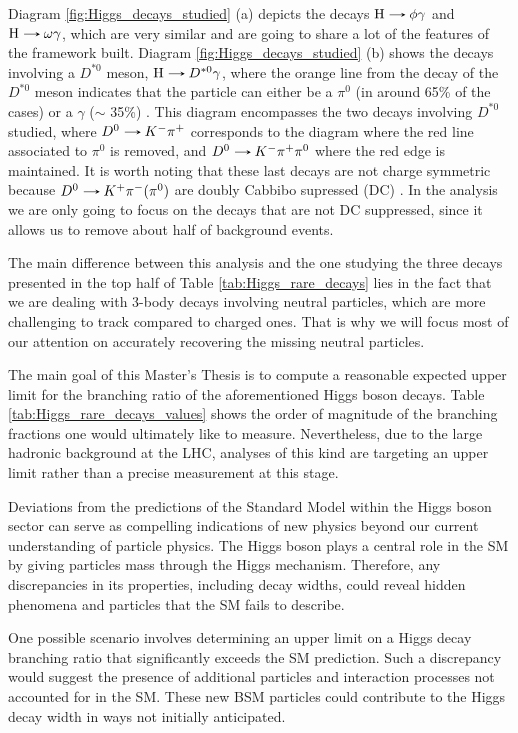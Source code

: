 Diagram \ref{fig:Higgs_decays_studied} (a) depicts the decays $\text{H}\decaysto \phi\gamma$ and $\text{H}\decaysto \omega\gamma$, which are very similar and are going to share a lot of the features of the framework built. Diagram \ref{fig:Higgs_decays_studied} (b) shows the decays involving a $D^{*0}$ meson, $\text{H}\decaysto D^{*0}\gamma$, where the orange line from the decay of the $D^{*0}$ meson indicates that the particle can either be a $\pi^{0}$ (in around 65\% of the cases) or a $\gamma$ ($\sim$ 35\%) \cite{PDG}. This diagram encompasses the two decays involving $D^{*0}$ studied, where $D^{0}\decaysto K^{-}\pi^{+}$ corresponds to the diagram where the red line associated to $\pi^{0}$ is removed, and $D^{0}\decaysto K^{-}\pi^{+}\pi^{0}$ where the red edge is maintained. It is worth noting that these last decays are not charge symmetric because $D^{0}\decaysto K^{+}\pi^{-} (\pi^0)$ are doubly Cabbibo supressed (DC) \cite{PDG}. In the analysis we are only going to focus on the decays that are not DC suppressed, since it allows us to remove about half of background events.

The main difference between this analysis and the one studying the three decays presented in the top half of Table \ref{tab:Higgs_rare_decays} lies in the fact that we are dealing with 3-body decays involving neutral particles, which are more challenging to track compared to charged ones. That is why we will focus most of our attention on accurately recovering the missing neutral particles.

The main goal of this Master's Thesis is to compute a reasonable expected upper limit for the branching ratio of the aforementioned Higgs boson decays. Table \ref{tab:Higgs_rare_decays_values} shows the order of magnitude of the branching fractions one would ultimately like to measure. Nevertheless, due to the large hadronic background at the LHC, analyses of this kind are targeting an upper limit rather than a precise measurement at this stage.

Deviations from the predictions of the Standard Model within the Higgs boson sector can serve as compelling indications of new physics beyond our current understanding of particle physics. The Higgs boson plays a central role in the SM by giving particles mass through the Higgs mechanism. Therefore, any discrepancies in its properties, including decay widths, could reveal hidden phenomena and particles that the SM fails to describe.

One possible scenario involves determining an upper limit on a Higgs decay branching ratio that significantly exceeds the SM prediction. Such a discrepancy would suggest the presence of additional particles and interaction processes not accounted for in the SM. These new BSM particles could contribute to the Higgs decay width in ways not initially anticipated.

